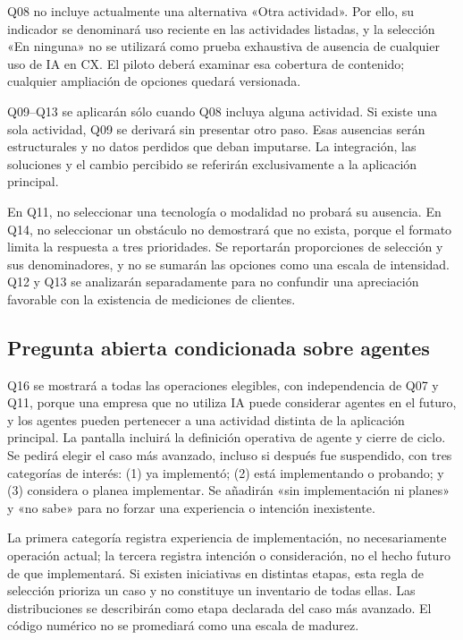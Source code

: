 \documentclass[12pt,letterpaper]{article}
\begin{document}
Q08 no incluye actualmente una alternativa «Otra actividad». Por ello, su indicador se denominará uso reciente en las actividades listadas, y la selección «En ninguna» no se utilizará como prueba exhaustiva de ausencia de cualquier uso de IA en CX. El piloto deberá examinar esa cobertura de contenido; cualquier ampliación de opciones quedará versionada.

Q09--Q13 se aplicarán sólo cuando Q08 incluya alguna actividad. Si existe una sola actividad, Q09 se derivará sin presentar otro paso. Esas ausencias serán estructurales y no datos perdidos que deban imputarse. La integración, las soluciones y el cambio percibido se referirán exclusivamente a la aplicación principal.

En Q11, no seleccionar una tecnología o modalidad no probará su ausencia. En Q14, no seleccionar un obstáculo no demostrará que no exista, porque el formato limita la respuesta a tres prioridades. Se reportarán proporciones de selección y sus denominadores, y no se sumarán las opciones como una escala de intensidad. Q12 y Q13 se analizarán separadamente para no confundir una apreciación favorable con la existencia de mediciones de clientes.

\subsection*{Pregunta abierta condicionada sobre agentes}
Q16 se mostrará a todas las operaciones elegibles, con independencia de Q07 y Q11, porque una empresa que no utiliza IA puede considerar agentes en el futuro, y los agentes pueden pertenecer a una actividad distinta de la aplicación principal. La pantalla incluirá la definición operativa de agente y cierre de ciclo. Se pedirá elegir el caso más avanzado, incluso si después fue suspendido, con tres categorías de interés: (1) ya implementó; (2) está implementando o probando; y (3) considera o planea implementar. Se añadirán «sin implementación ni planes» y «no sabe» para no forzar una experiencia o intención inexistente.

La primera categoría registra experiencia de implementación, no necesariamente operación actual; la tercera registra intención o consideración, no el hecho futuro de que implementará. Si existen iniciativas en distintas etapas, esta regla de selección prioriza un caso y no constituye un inventario de todas ellas. Las distribuciones se describirán como etapa declarada del caso más avanzado. El código numérico no se promediará como una escala de madurez.
\end{document}
